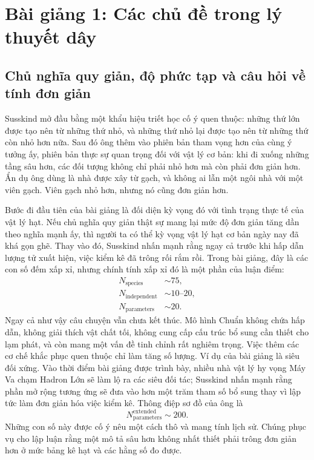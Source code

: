 \chapter{Bài giảng 1: Các chủ đề trong lý thuyết dây}


\section{Chủ nghĩa quy giản, độ phức tạp và câu hỏi về tính đơn giản}

Susskind mở đầu bằng một khẩu hiệu triết học cố ý quen thuộc: những thứ lớn được tạo nên từ những thứ nhỏ, và những thứ nhỏ lại được tạo nên từ những thứ còn nhỏ hơn nữa. Sau đó ông thêm vào phiên bản tham vọng hơn của cùng ý tưởng ấy, phiên bản thực sự quan trọng đối với vật lý cơ bản: khi đi xuống những tầng sâu hơn, các đối tượng không chỉ phải nhỏ hơn mà còn phải đơn giản hơn. Ẩn dụ ông dùng là nhà được xây từ gạch, và không ai lẫn một ngôi nhà với một viên gạch. Viên gạch nhỏ hơn, nhưng nó cũng đơn giản hơn.

Bước đi đầu tiên của bài giảng là đối diện kỳ vọng đó với tình trạng thực tế của vật lý hạt. Nếu chủ nghĩa quy giản thật sự mang lại mức độ đơn giản tăng dần theo nghĩa mạnh ấy, thì người ta có thể kỳ vọng vật lý hạt cơ bản ngày nay đã khá gọn ghẽ. Thay vào đó, Susskind nhấn mạnh rằng ngay cả trước khi hấp dẫn lượng tử xuất hiện, việc kiểm kê đã trông rối rắm rồi. Trong bài giảng, đây là các con số đếm xấp xỉ, nhưng chính tính xấp xỉ đó là một phần của luận điểm:
\begin{equation}
\begin{aligned}
N_{\mathrm{species}}&\sim 75,\\
N_{\mathrm{independent}}&\sim 10\text{--}20,\\
N_{\mathrm{parameters}}&\sim 20.
\end{aligned}
\end{equation}
Ngay cả như vậy câu chuyện vẫn chưa kết thúc. Mô hình Chuẩn không chứa hấp dẫn, không giải thích vật chất tối, không cung cấp cấu trúc bổ sung cần thiết cho lạm phát, và còn mang một vấn đề tinh chỉnh rất nghiêm trọng. Việc thêm các cơ chế khắc phục quen thuộc chỉ làm tăng số lượng. Ví dụ của bài giảng là siêu đối xứng. Vào thời điểm bài giảng được trình bày, nhiều nhà vật lý hy vọng Máy Va chạm Hadron Lớn sẽ làm lộ ra các siêu đối tác; Susskind nhấn mạnh rằng phần mở rộng tương ứng sẽ đưa vào hơn một trăm tham số bổ sung thay vì lập tức làm đơn giản hóa việc kiểm kê. Thông điệp sơ đồ của ông là
\begin{equation}
N_{\mathrm{parameters}}^{\mathrm{extended}} \sim 200.
\end{equation}
Những con số này được cố ý nêu một cách thô và mang tính lịch sử. Chúng phục vụ cho lập luận rằng một mô tả sâu hơn không nhất thiết phải trông đơn giản hơn ở mức bảng kê hạt và các hằng số đo được.


